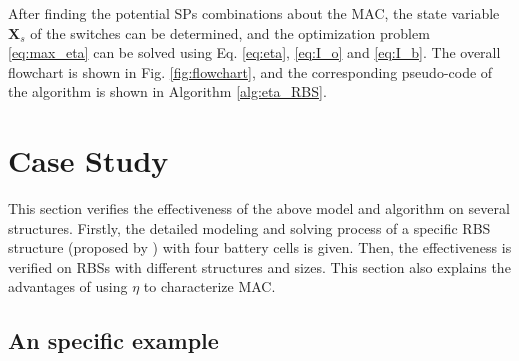 \documentclass{article}
\begin{document}
After finding the potential SPs combinations about the MAC, the state variable $\bm{X}_s$ of the switches can be determined, and the optimization problem \ref{eq:max_eta} can be solved using Eq. \ref{eq:eta}, \ref{eq:I_o} and \ref{eq:I_b}.
The overall flowchart is shown in Fig. \ref{fig:flowchart}, and the corresponding pseudo-code of the algorithm is shown in Algorithm \ref{alg:eta_RBS}.

\section{Case Study}

This section verifies the effectiveness of the above model and algorithm on several structures.
Firstly, the detailed modeling and solving process of a specific RBS structure (proposed by \cite{visairoReconfigurableBatteryPack2008}) with four battery cells is given.
Then, the effectiveness is verified on RBSs with different structures and sizes.
This section also explains the advantages of using $\eta$ to characterize MAC.

\subsection{An specific example}
\end{document}
